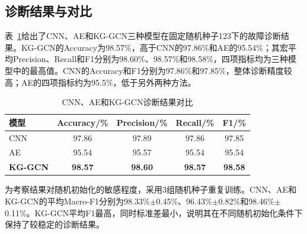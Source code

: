 \subsection{诊断结果与对比}
\label{subsec:results_v7}

表~\ref{tab:main_result_v7}给出了CNN、AE和KG-GCN三种模型在固定随机种子123下的故障诊断结果。KG-GCN的Accuracy为98.57\%，高于CNN的97.86\%和AE的95.54\%；其宏平均Precision、Recall和F1分别为98.60\%、98.57\%和98.58\%，四项指标均为三种模型中的最高值。CNN的Accuracy和F1分别为97.86\%和97.85\%，整体诊断精度较高；AE的四项指标约为95.5\%，低于另外两种方法。

\begin{table}[htbp]
    \centering
    \caption{CNN、AE和KG-GCN诊断结果对比}
    \label{tab:main_result_v7}
    \begin{tabular}{lcccc}
        \toprule
        模型 & Accuracy/\% & Precision/\% & Recall/\% & F1/\% \\
        \midrule
        CNN & 97.86 & 97.89 & 97.86 & 97.85 \\
        AE & 95.54 & 95.57 & 95.54 & 95.54 \\
        \textbf{KG-GCN} & \textbf{98.57} & \textbf{98.60} & \textbf{98.57} & \textbf{98.58} \\
        \bottomrule
    \end{tabular}
\end{table}

为考察结果对随机初始化的敏感程度，采用3组随机种子重复训练。CNN、AE和KG-GCN的平均Macro-F1分别为98.33\%$\pm$0.45\%、96.43\%$\pm$0.82\%和98.46\%$\pm$0.11\%。KG-GCN平均F1最高，同时标准差最小，说明其在不同随机初始化条件下保持了较稳定的诊断结果。

